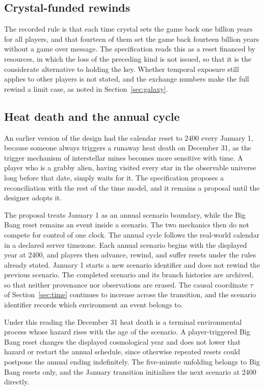 \documentclass[11pt]{article}
\begin{document}
\subsection{Crystal-funded rewinds}

The recorded rule is that each time crystal sets the game back one billion years for all players, and that fourteen of them set the game back fourteen billion years without a game over message. The specification reads this as a reset financed by resources, in which the loss of the preceding kind is not issued, so that it is the considerate alternative to holding the key. Whether temporal exposure still applies to other players is not stated, and the exchange numbers make the full rewind a limit case, as noted in Section~\ref{sec:galaxy}.

\subsection{Heat death and the annual cycle}

An earlier version of the design had the calendar reset to 2400 every January 1, because someone always triggers a runaway heat death on December 31, as the trigger mechanism of interstellar mines becomes more sensitive with time. A player who is a grabby alien, having visited every star in the observable universe long before that date, simply waits for it. The specification proposes a reconciliation with the rest of the time model, and it remains a proposal until the designer adopts it.

The proposal treats January 1 as an annual scenario boundary, while the Big Bang reset remains an event inside a scenario. The two mechanics then do not compete for control of one clock. The annual cycle follows the real-world calendar in a declared server timezone. Each annual scenario begins with the displayed year at 2400, and players then advance, rewind, and suffer resets under the rules already stated. January 1 starts a new scenario identifier and does not rewind the previous scenario. The completed scenario and its branch histories are archived, so that neither provenance nor observations are erased. The causal coordinate $\tau$ of Section~\ref{sec:time} continues to increase across the transition, and the scenario identifier records which environment an event belongs to.

Under this reading the December 31 heat death is a terminal environmental process whose hazard rises with the age of the scenario. A player-triggered Big Bang reset changes the displayed cosmological year and does not lower that hazard or restart the annual schedule, since otherwise repeated resets could postpone the annual ending indefinitely. The five-minute unfolding belongs to Big Bang resets only, and the January transition initializes the next scenario at 2400 directly.
\end{document}
